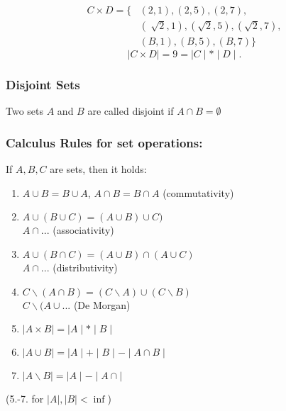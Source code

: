 \documentclass[twocolumn]{article}
\begin{document}
				\[
				\begin{split}
					C\times D=\{ & (2,1),(2,5),(2,7),\\
						     & (\sqrt[]{2},1),(\sqrt 2,5),(\sqrt2,7),\\
						     & (B,1),(B,5),(B,7)\}
				\end{split}
				\] 
				\[
				\mid C\times D\mid=9=\mid C\mid*\mid D\mid
				.\] 
		\subsubsection{Disjoint Sets}
			Two sets $A$ and $B$ are called disjoint if $A\cap B=\emptyset$ 
		
		\subsubsection{Calculus Rules for set operations:}
			If $A,B,C$ are sets, then it holds:
			\begin{enumerate}
			\item $A\cup B=B\cup A$, $A\cap B=B\cap A$ (commutativity)
			\item $A\cup(B\cup C)=(A\cup B)\cup C)$ \\
				$A\cap...$ (associativity)
			\item $A\cup(B\cap C)=(A\cup B)\cap(A\cup C)$\\
				$A\cap...$ (distributivity)
			\item $C\backslash(A\cap B)=(C\backslash A)\cup(C\backslash B)$\\
				$C\backslash(A\cup...$  (De Morgan)
			\item $\mid A\times B\mid=\mid A\mid*\mid B\mid$
			\item $\mid A\cup B\mid=\mid A\mid+\mid B\mid -\mid A\cap B\mid$
			\item $\mid A\backslash B\mid =\mid A\mid -\mid A\cap\mid $ 
			\end{enumerate}
			(5.-7. for $\mid A\mid,\mid B\mid<\inf$)
\end{document}

